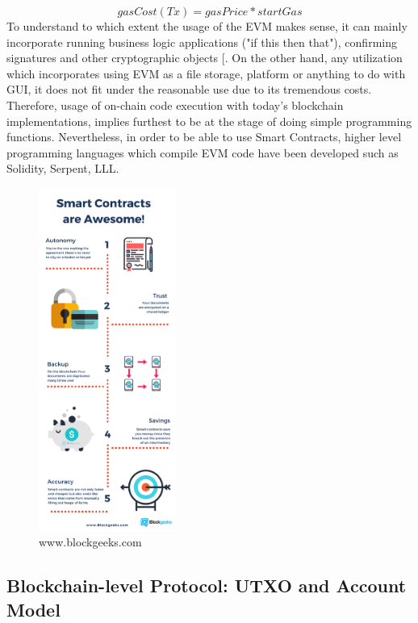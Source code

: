 				\[ gasCost(Tx)= {gasPrice *  startGas}\]
To understand to which extent the usage of the EVM makes sense, it can mainly incorporate running business logic applications ("if this then that"), confirming signatures and other cryptographic objects [\cite{Ethereum2017}. On the other hand, any utilization which incorporates using EVM as a file storage, platform or anything to do with GUI, it does not fit under the reasonable use due to its tremendous costs. Therefore, usage of on-chain code execution with today's blockchain implementations, implies furthest to be at the stage of doing simple programming functions. Nevertheless, in order to be able to use Smart Contracts, higher level programming languages which compile EVM code have been developed such as Solidity, Serpent, LLL.



\begin{figure}[h]
\centering
\includegraphics[width=0.4\textwidth]{images/smartcontracts.png}
\caption{\label{fig:Smartcontracts}www.blockgeeks.com}
\end{figure}




\subsection{Blockchain-level Protocol: UTXO and Account Model}

